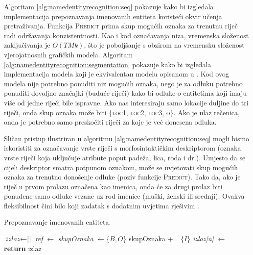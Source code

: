 Algoritam \ref{alg:namedentityrecognition:seq} pokazuje kako bi izgledala
implementacija prepoznavanja imenovanih entiteta koristeći okvir učenja
pretraživanja. Funkcija \textsc{Predict} prima skup mogućih oznaka za trenutnu
riječ radi održavanja konzistentnosti. Kao i kod označavanja niza, vremenska
složenost zaključivanja je $O(T M k)$, što je poboljšanje s obzirom na vremensku
složenost vjerojatnosnih grafičkih modela. Algoritam
\ref{alg:namedentityrecognition:segmentation} pokazuje kako bi izgledala
implementacija modela koji je ekvivalentan modelu opisanom u
\citep{sarawagi2004semi}. Kod ovog modela nije potrebno ponuditi niz mogućih
oznaka, nego je za odluku potrebno ponuditi dovoljno značajki (buduće riječi)
kako bi odluke o entitetima koji imaju više od jedne riječi bile ispravne. Ako
nas interesiraju samo lokacije duljine do tri riječi, onda skup oznaka može biti
\{\textsc{loc1}, \textsc{loc2}, \textsc{loc3}, \textsc{o}\}. Ako je ulaz
rečenica, onda je potrebno samo preskočiti riječi za koje je već donesena
odluka.

Sličan pristup ilustriran u algoritmu \ref{alg:namedentityrecognition:seq} mogli
bismo iskoristiti za označavanje vrste riječi s morfosintaktičkim deskriptorom
(oznaka vrste riječi koja uključuje atribute poput padeža, lica, roda i dr.).
Umjesto da se cijeli deskriptor smatra potpunom oznakom, može se uvjetovati skup
mogućih oznaka za trenutno donošenje odluke (poziv funkcije \textsc{Predict}).
Tako da, ako je riječ u prvom prolazu označena kao imenica, onda će za
drugi prolaz biti ponuđene samo odluke vezane uz rod imenice (muški, ženski
ili srednji). Ovakva fleksibilnost čini bilo koji zadatak s dodatnim uvjetima
 rješivim \citep{chang2012structured}.

\begin{algorithm}[H]
\caption{Prepoznavanje imenovanih entiteta.}
\label{alg:namedentityrecognition:seq}
\begin{algorithmic}[1]
\State $\textit{izlaz} \gets \text{[]}$
  \State \textit{ref} $\gets$ 
  \State \textit{skupOznaka} $\gets \{B,O\}$
    \State skupOznaka += $\{I\}$
  \EndIf
  \State \textit{izlaz[n]} $\gets$ 
\EndFor
\State {}
\State \textbf{return} izlaz
\EndFunction
\end{algorithmic}
\end{algorithm}

